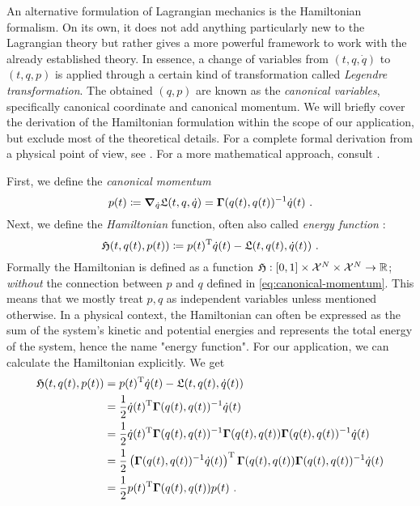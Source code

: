 An alternative formulation of Lagrangian mechanics is the Hamiltonian formalism.
On its own, it does not add anything particularly new to the Lagrangian theory but rather gives a more powerful framework to work with the already established theory.
In essence, a change of variables from $(t, q, \dot{q})$ to $(t, q, p)$ is applied through a certain kind of transformation called \emph{Legendre transformation}.
The obtained $(q, p)$ are known as the \emph{canonical variables}, specifically canonical coordinate and canonical momentum.
We will briefly cover the derivation of the Hamiltonian formulation within the scope of our application, but exclude most of the theoretical details.
For a complete formal derivation from a physical point of view, see \cite[Chapter~8]{goldstein01}.
For a more mathematical approach, consult \cite[Chapter~2]{marsden10}.

First, we define the \emph{canonical momentum}
\begin{equation}
\label{eq:canonical-momentum}
	p(t) \coloneqq \grad_{\dot{q}} \mathfrak{L}(t, q, \dot{q}) = \mathbf{\Gamma}(q(t), q(t))^{-1} \dot{q}(t) \ .
\end{equation}
Next, we define the \emph{Hamiltonian} function, often also called \emph{energy function} \cite{marsden10}:
\begin{equation}
	\mathfrak{H}(t, q(t), p(t)) \coloneqq p(t)^\mathrm{T}\dot{q}(t) - \mathfrak{L}(t, q(t), \dot{q}(t)) \ .
\end{equation}
Formally the Hamiltonian is defined as a function $\mathfrak{H}: [0,1] \times \mathcal{X}^N \times \mathcal{X}^N \rightarrow \mathbb{R}$; \emph{without} the connection between $p$ and $q$ defined in \cref{eq:canonical-momentum}.
This means that we mostly treat $p, q$ as independent variables unless mentioned otherwise.
In a physical context, the Hamiltonian can often be expressed as the sum of the system's kinetic and potential energies and represents the total energy of the system, hence the name "energy function".
For our application, we can calculate the Hamiltonian explicitly.
We get
\begin{align}
	\mathfrak{H}(t, q(t), p(t)) &=p(t)^\mathrm{T}\dot{q}(t) - \mathfrak{L}(t, q(t), \dot{q}(t))\\
	&= \frac{1}{2} \dot{q}(t)^{\mathrm{T}} \mathbf{\Gamma}(q(t), q(t))^{-1} \dot{q}(t) \\
	&= \frac{1}{2} \dot{q}(t)^{\mathrm{T}} \mathbf{\Gamma}(q(t), q(t))^{-1} \mathbf{\Gamma}(q(t), q(t)) \mathbf{\Gamma}(q(t), q(t))^{-1} \dot{q}(t)\\
	&= \frac{1}{2}  \left(\mathbf{\Gamma}(q(t), q(t))^{-1} \dot{q}(t)\right)^{\mathrm{T}} \mathbf{\Gamma}(q(t), q(t)) \mathbf{\Gamma}(q(t), q(t))^{-1} \dot{q}(t)\\
	&= \frac{1}{2} p(t)^{\mathrm{T}} \mathbf{\Gamma}(q(t), q(t)) p(t) \ .
\end{align}

